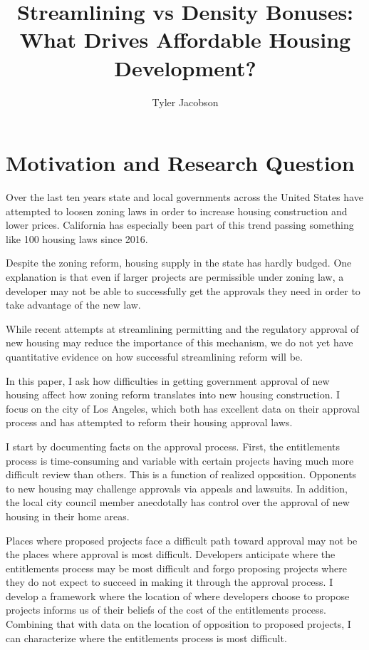 \documentclass[12pt]{article}
\title{Streamlining vs Density Bonuses: \\
 What Drives Affordable Housing Development?}
\author{Tyler Jacobson}
\theoremstyle{definition}
\begin{document}
\maketitle
\section{Motivation and Research Question}

Over the last ten years state and local governments across the United States have attempted to loosen zoning laws in order to increase housing construction and lower prices. California has especially been part of this trend passing something like 100 housing laws since 2016. 

Despite the zoning reform, housing supply in the state has hardly budged. One explanation is that even if larger projects are permissible under zoning law, a developer may not be able to successfully get the approvals they need in order to take advantage of the new law. 

While recent attempts at streamlining permitting and the regulatory approval of new housing may reduce the importance of this mechanism, we do not yet have quantitative evidence on how successful streamlining reform will be. 

In this paper, I ask how difficulties in getting government approval of new housing affect how zoning reform translates into new housing construction. I focus on the city of Los Angeles, which both has excellent data on their approval process and has attempted to reform their housing approval laws. 

I start by documenting facts on the approval process. First, the entitlements process is time-consuming and variable with certain projects having much more difficult review than others. This is a function of realized opposition. Opponents to new housing may challenge approvals via appeals and lawsuits. In addition, the local city council member anecdotally has control over the approval of new housing in their home areas. 

Places where proposed projects face a difficult path toward approval may not be the places where approval is most difficult. Developers anticipate where the entitlements process may be most difficult and forgo proposing projects where they do not expect to succeed in making it through the approval process. I develop a framework where the location of where developers choose to propose projects informs us of their beliefs of the cost of the entitlements process. Combining that with data on the location of opposition to proposed projects, I can characterize where the entitlements process is most difficult. 
\end{document}
